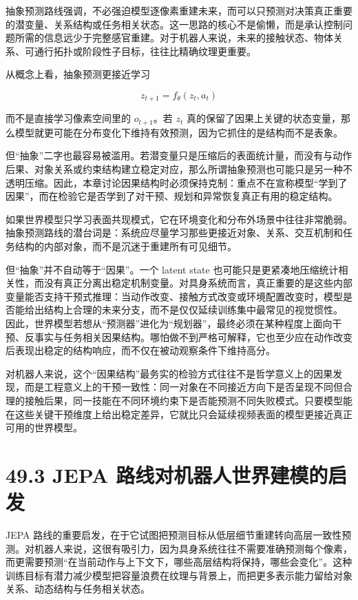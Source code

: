 抽象预测路线强调，不必强迫模型逐像素重建未来，而可以只预测对决策真正重要的潜变量、关系结构或任务相关状态。这一思路的核心不是偷懒，而是承认控制问题所需的信息远少于完整感官重建。对于机器人来说，未来的接触状态、物体关系、可通行拓扑或阶段性子目标，往往比精确纹理更重要。

从概念上看，抽象预测更接近学习

\begin{equation*}
z_{t+1} = f_\theta(z_t, a_t)
\end{equation*}

而不是直接学习像素空间里的 \(o_{t+1}\)。若 \(z_t\) 真的保留了因果上关键的状态变量，那么模型就更可能在分布变化下维持有效预测，因为它抓住的是结构而不是表象。

但“抽象”二字也最容易被滥用。若潜变量只是压缩后的表面统计量，而没有与动作后果、对象关系或约束结构建立稳定对应，那么所谓抽象预测也可能只是另一种不透明压缩。因此，本章讨论因果结构时必须保持克制：重点不在宣称模型“学到了因果”，而在检验它是否学到了对干预、规划和异常恢复真正有用的稳定结构。

如果世界模型只学习表面共现模式，它在环境变化和分布外场景中往往非常脆弱。抽象预测路线的潜台词是：系统应尽量学习那些更接近对象、关系、交互机制和任务结构的内部对象，而不是沉迷于重建所有可见细节。

但“抽象”并不自动等于“因果”。一个 latent state 也可能只是更紧凑地压缩统计相关性，而没有真正分离出稳定机制变量。对具身系统而言，真正重要的是这些内部变量能否支持干预式推理：当动作改变、接触方式改变或环境配置改变时，模型是否能给出结构上合理的未来分支，而不是仅仅延续训练集中最常见的视觉惯性。 因此，世界模型若想从“预测器”进化为“规划器”，最终必须在某种程度上面向干预、反事实与任务相关因果结构。哪怕做不到严格可解释，它也至少应在动作改变后表现出稳定的结构响应，而不仅在被动观察条件下维持高分。

对机器人来说，这个“因果结构”最务实的检验方式往往不是哲学意义上的因果发现，而是工程意义上的干预一致性：同一对象在不同接近方向下是否呈现不同但合理的接触后果，同一技能在不同环境约束下是否能预测不同失败模式。只要模型能在这些关键干预维度上给出稳定差异，它就比只会延续视频表面的模型更接近真正可用的世界模型。

\section*{49.3 JEPA 路线对机器人世界建模的启发}


JEPA 路线的重要启发，在于它试图把预测目标从低层细节重建转向高层一致性预测。对机器人来说，这很有吸引力，因为具身系统往往不需要准确预测每个像素，而更需要预测“在当前动作与上下文下，哪些高层结构将保持，哪些会变化”。这种训练目标有潜力减少模型把容量浪费在纹理与背景上，而把更多表示能力留给对象关系、动态结构与任务相关状态。


